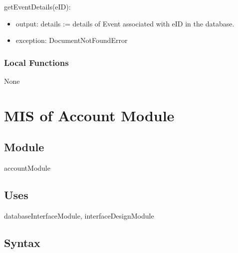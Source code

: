 \documentclass[12pt, titlepage]{article}
\begin{document}
\noindent getEventDetails(eID):
\begin{itemize}
\item output: details := details of Event associated with eID in the database.
\item exception: DocumentNotFoundError
\end{itemize}




\subsubsection{Local Functions}

None



\section{MIS of Account Module} \label{mB} 



\subsection{Module}

accountModule


\subsection{Uses}

databaseInterfaceModule, interfaceDesignModule

\subsection{Syntax}
\end{document}
